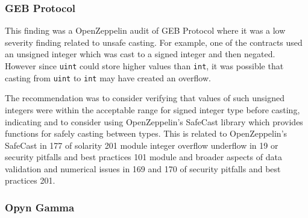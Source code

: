 \subsubsection{GEB Protocol}\label{geb-protocol}

This finding was a OpenZeppelin audit of GEB Protocol where it was a low
severity finding related to unsafe casting. For example, one of the
contracts used an unsigned integer which was cast to a signed integer
and then negated. However since \texttt{uint} could store higher values
than \texttt{int}, it was possible that casting from \texttt{uint} to
\texttt{int} may have created an overflow.

The recommendation was to consider verifying that values of such
unsigned integers were within the acceptable range for signed integer
type before casting, indicating and to consider using OpenZeppelin's
SafeCast library which provides functions for safely casting between
types. This is related to OpenZeppelin's SafeCast in 177 of solarity 201
module integer overflow underflow in 19 or security pitfalls and best
practices 101 module and broader aspects of data validation and
numerical issues in 169 and 170 of security pitfalls and best practices
201.

\subsubsection{Opyn Gamma}\label{opyn-gamma}

